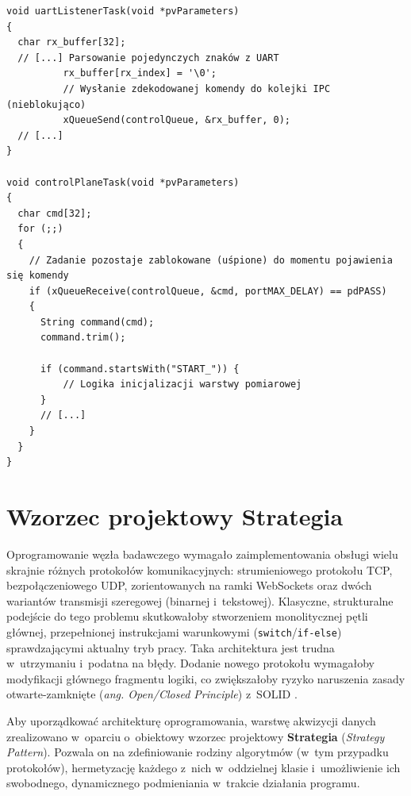 \begin{listing}[htbp]
    \caption{Mechanizm bezkolizyjnej komunikacji IPC pomiędzy rdzeniami za pomocą kolejek systemowych (\texttt{main.cpp}) \cite{espy_nexus_esp32_firmware}.}
    \label{lst:freertos_queue}
    \begin{verbatim}
void uartListenerTask(void *pvParameters)
{
  char rx_buffer[32];
  // [...] Parsowanie pojedynczych znaków z UART
          rx_buffer[rx_index] = '\0';
          // Wysłanie zdekodowanej komendy do kolejki IPC (nieblokująco)
          xQueueSend(controlQueue, &rx_buffer, 0); 
  // [...]
}

void controlPlaneTask(void *pvParameters)
{
  char cmd[32];
  for (;;)
  {
    // Zadanie pozostaje zablokowane (uśpione) do momentu pojawienia się komendy
    if (xQueueReceive(controlQueue, &cmd, portMAX_DELAY) == pdPASS)
    {
      String command(cmd);
      command.trim();

      if (command.startsWith("START_")) {
          // Logika inicjalizacji warstwy pomiarowej
      }
      // [...]
    }
  }
}
\end{verbatim}
\end{listing}

\section{Wzorzec projektowy Strategia}
\label{sec:wzorzec_strategia}

Oprogramowanie węzła badawczego wymagało zaimplementowania obsługi wielu skrajnie różnych protokołów komunikacyjnych: strumieniowego protokołu TCP, bezpołączeniowego UDP, zorientowanych na ramki WebSockets oraz dwóch wariantów transmisji szeregowej (binarnej i~tekstowej).
Klasyczne, strukturalne podejście do tego problemu skutkowałoby stworzeniem monolitycznej pętli głównej, przepełnionej instrukcjami warunkowymi (\texttt{switch}/\texttt{if-else}) sprawdzającymi aktualny tryb pracy.
Taka architektura jest trudna w~utrzymaniu i~podatna na błędy. Dodanie nowego protokołu wymagałoby modyfikacji głównego fragmentu logiki, co zwiększałoby ryzyko naruszenia zasady otwarte-zamknięte (\textit{ang. Open/Closed Principle}) z~SOLID \cite{solid}.

Aby uporządkować architekturę oprogramowania, warstwę akwizycji danych zrealizowano w~oparciu o~obiektowy wzorzec projektowy \textbf{Strategia} (\textit{Strategy Pattern}).
Pozwala on na zdefiniowanie rodziny algorytmów (w~tym przypadku protokołów), hermetyzację każdego z~nich w~oddzielnej klasie i~umożliwienie ich swobodnego, dynamicznego podmieniania w~trakcie działania programu.

